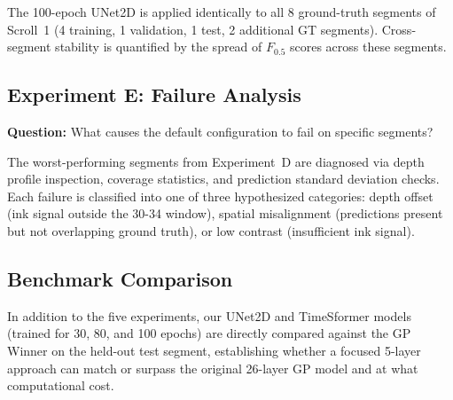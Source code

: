 The 100-epoch UNet2D is applied identically to all 8 ground-truth segments of Scroll~1 (4 training, 1 validation, 1 test, 2 additional GT segments). Cross-segment stability is quantified by the spread of $F_{0.5}$ scores across these segments.

\subsection{Experiment E: Failure Analysis}
\label{sec:exp_e}

\textbf{Question:} What causes the default configuration to fail on specific segments?

The worst-performing segments from Experiment~D are diagnosed via depth profile inspection, coverage statistics, and prediction standard deviation checks. Each failure is classified into one of three hypothesized categories: depth offset (ink signal outside the 30-34 window), spatial misalignment (predictions present but not overlapping ground truth), or low contrast (insufficient ink signal).

\subsection{Benchmark Comparison}
\label{sec:benchmark}

In addition to the five experiments, our UNet2D and TimeSformer models (trained for 30, 80, and 100 epochs) are directly compared against the GP Winner on the held-out test segment, establishing whether a focused 5-layer approach can match or surpass the original 26-layer GP model and at what computational cost.
\vspace{2\baselineskip}

\newpage
